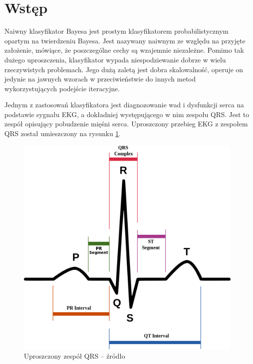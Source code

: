 \section{Wstęp}
\label{sec_wstep}

Naiwny klasyfikator Bayesa jest prostym klasyfikatorem probabilistycznym opartym na twierdzeniu Bayesa. Jest nazywany naiwnym ze względu na przyjęte założenie, mówiące, że poszczególne cechy są wzajemnie niezależne. Pomimo tak dużego uproszczenia, klasyfikator wypada niespodziewanie dobrze w wielu rzeczywistych problemach. Jego dużą zaletą jest dobra skalowalność, operuje on jedynie na jawnych wzorach w przeciwieństwie do innych metod wykorzystujących podejście iteracyjne.

Jednym z zastosowań klasyfikatora jest diagnozowanie wad i dysfunkcji serca na podstawie sygnału EKG, a dokładniej występującego w nim zespołu QRS. Jest to zespół opisujący pobudzenie mięśni serca. Uproszczony przebieg EKG z zespołem QRS został umieszczony na rysunku \ref{fig_qrs}.

\begin{figure}[!htb]
  \begin{center}
    \includegraphics[scale = 0.25]
    {img/qrs.png}
  \end{center}
  \caption{Uproszczony zespół QRS -- źródło \cite{bibWikipedia}}
  \label{fig_qrs}
\end{figure}

